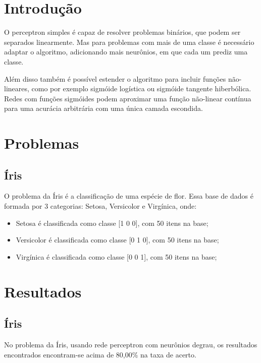 \renewcommand{\figurename}{Figura}

\section{Introdução}

O perceptron simples é capaz de resolver problemas binários, que podem
ser separados linearmente. Mas para problemas com mais de uma classe é
necessário adaptar o algoritmo, adicionando mais neurônios, em que cada
um prediz uma classe.

Além disso também é possível estender o algoritmo para incluir funções
não-lineares, como por exemplo sigmóide logística ou sigmóide tangente
hiberbólica. Redes com funções sigmóides podem aproximar uma função
não-linear contínua para uma acurácia arbitrária com uma única camada
escondida.

\section{Problemas}

\subsection{Íris}

O problema da Íris é a classificação de uma espécie de flor. Essa base
de dados é formada por 3 categorias: Setosa, Versicolor e Virgínica,
onde:

\begin{itemize}
\tightlist
\item
  Setosa é classificada como classe {[}1 0 0{]}, com 50 itens na base;
\item
  Versicolor é classificada como classe {[}0 1 0{]}, com 50 itens na
  base;
\item
  Virgínica é classificada como classe {[}0 0 1{]}, com 50 itens na
  base;
\end{itemize}

\section{Resultados}

\subsection{Íris}

No problema da Íris, usando rede perceptron com neurônios degrau, os
resultados encontrados encontram-se acima de 80,00\% na taxa de acerto.

